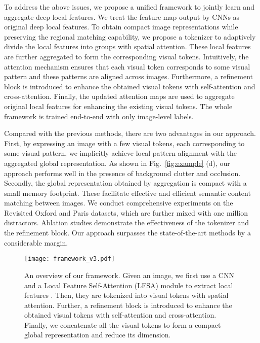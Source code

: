 \documentclass[letterpaper]{article} \usepackage{aaai22}  \usepackage{times}  \usepackage{helvet}  \usepackage{courier}  \usepackage[hyphens]{url}  \usepackage{graphicx} \urlstyle{rm} \def\UrlFont{\rm}  \usepackage{natbib}  \usepackage{caption} \DeclareCaptionStyle{ruled}{labelfont=normalfont,labelsep=colon,strut=off} \frenchspacing  \setlength{\pdfpagewidth}{8.5in}  \setlength{\pdfpageheight}{11in}  \usepackage{algorithm}
\begin{document}
To address the above issues, we propose a unified framework to jointly learn and aggregate deep local features. 
We treat the feature map output by CNNs as original deep local features.
To obtain compact image representations while preserving the regional matching capability, we propose a tokenizer to adaptively divide the local features into groups with spatial attention. These local features are further aggregated to form the corresponding visual tokens. Intuitively, the attention mechanism ensures that each visual token corresponds to some visual pattern and these patterns are aligned across images. Furthermore, a refinement block is introduced to enhance the obtained visual tokens with self-attention and cross-attention. Finally, the updated attention maps are used to aggregate original local features for enhancing the existing visual tokens. The whole framework is trained end-to-end with only image-level labels.

Compared with the previous methods, there are two advantages in our approach. 
First, by expressing an image with a few visual tokens, each corresponding to some visual pattern, we implicitly achieve local pattern alignment with the aggregated global representation. As shown in Fig.~\ref{fig:example} (d), our approach performs well in the presence of background clutter and occlusion. 
Secondly, the global representation obtained by aggregation is compact with a small memory footprint.  
These facilitate effective and efficient semantic content matching between images. 
We conduct comprehensive experiments on the Revisited Oxford and Paris datasets, which are further mixed with one million distractors.
Ablation studies demonstrate the effectiveness of the tokenizer and the refinement block.
Our approach surpasses the state-of-the-art methods by a considerable margin. 

\begin{figure*}[t]
	\begin{center}
		\texttt{[image: framework\_v3.pdf]}
	\end{center}
	\caption{An overview of our framework. 
		Given an image, we first use a CNN and a Local Feature Self-Attention (LFSA) module to extract local features . Then, they are tokenized into  visual tokens with spatial attention. 
		Further, a refinement block is introduced to enhance the obtained visual tokens with self-attention and cross-attention.
		Finally, we concatenate all the visual tokens to form a compact global representation  and reduce its dimension.}
	\label{fig:framwork}
\end{figure*}
\end{document}
